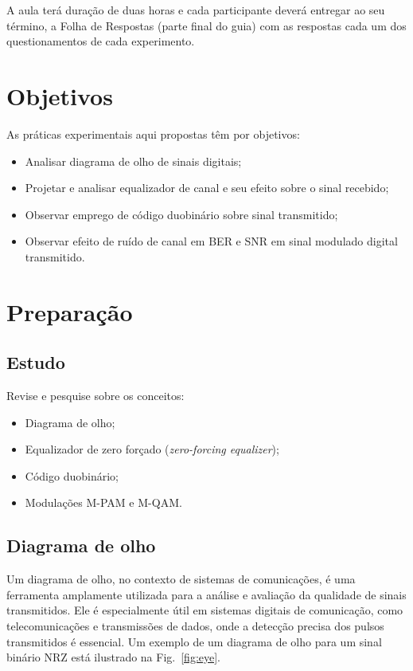 \documentclass[12pt,addpoints]{exam}
\begin{document}
A aula terá duração de duas horas e cada participante deverá entregar ao seu término, a Folha de Respostas (parte final do guia) com as respostas cada um dos questionamentos de cada experimento.

\section{Objetivos}

As práticas experimentais aqui propostas têm por objetivos:
\begin{itemize}
    \item Analisar diagrama de olho de sinais digitais;
    \item Projetar e analisar equalizador de canal e seu efeito sobre o sinal recebido;
    \item Observar emprego de código duobinário sobre sinal transmitido;
    \item Observar efeito de ruído de canal em BER e SNR em sinal modulado digital transmitido.
\end{itemize}

\section{Preparação} \label{sect:Preparacao}

\subsection{Estudo}

Revise e pesquise sobre os conceitos:
\begin{itemize}
    \item Diagrama de olho;
    \item Equalizador de zero forçado (\textit{zero-forcing equalizer});
    \item Código duobinário;
    \item Modulações M-PAM e M-QAM.
\end{itemize}
\subsection{Diagrama de olho}
Um diagrama de olho, no contexto de sistemas de comunicações, é uma ferramenta amplamente utilizada para a análise e avaliação da qualidade de sinais transmitidos. Ele é especialmente útil em sistemas digitais de comunicação, como telecomunicações e transmissões de dados, onde a detecção precisa dos pulsos transmitidos é essencial. Um exemplo de um diagrama de olho para um sinal binário NRZ está ilustrado na Fig.~\ref{fig:eye}.
\end{document}
